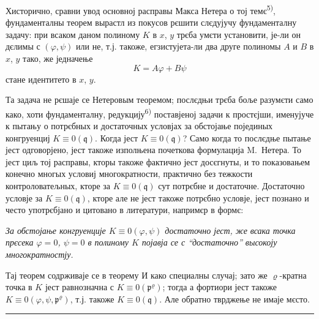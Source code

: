 \documentclass[11pt]{article}
\theoremstyle{plain}
\begin{document}
Хисторично, сравни увод основној расправы Макса Нетера о тој
темє\textsuperscript{5)}, фундаменталны теорем вырастл из покусов
рєшити слєдујучу фундаменталну задачу: при всаком даном полиному
$K$ в $x$, $y$ трєба умєти установити, је-ли он дєлимы с
$(\varphi, \psi)$ или не, т.ј. такоже, егзистујета-ли два друге
полиномы $A$ и $B$ в $x$, $y$ тако, же једначење
\[
K = A\varphi + B\psi
\]
стане идентитето в $x$, $y$.

Та задача не рєшаје се Нетеровым теоремом; послєдњи трєба боље
разумєти само како, хоти фундаменталну, редукцију\textsuperscript{6)}
поставјеној задачи к простєјши, именујуче к пытању о потрєбных и
достаточных условјах за обстојање појединых конгруенциј
$K \equiv 0(\mathfrak{q})$. Когда јест $K \equiv 0(\mathfrak{q})$?
Само когда то послєдње пытање јест одговорјено, јест такоже
изполњена почеткова формулација M.\ Нетера. То јест циљ тој
расправы, кторы такоже фактично јест досєгнуты, и то показовањем
конечно многых условиј многократности, практично без тежкости
контроловатељных, кторе за $K \equiv 0(\mathfrak{q})$ сут
потрєбне и достаточне. Достаточно условје за
$K \equiv 0(\mathfrak{q})$, кторе але не јест такоже потрєбно
условје, јест познано и често употрєбјано и цитовано в литератури,
напримєр в формє:

\smallskip
\textit{За обстојање конгруенције $K \equiv 0(\varphi, \psi)$
достаточно јест, же всака точка прєсека $\varphi = 0$, $\psi = 0$
в полиному $K$ појавја се с ``достаточно'' высокоју многократностју.}

\smallskip
Тај теорем содрживаје се в теорему И како специалны случај; зато же
$\varrho$-кратна точка в $K$ јест равнозначна с
$K \equiv 0(\mathfrak{p}^{\varrho})$; тогда а фортиори јест такоже
$K \equiv 0(\varphi, \psi, \mathfrak{p}^{\varrho})$, т.ј. такоже
$K \equiv 0(\mathfrak{q})$. Але обратно тврджење не имаје мєсто.

\vspace{0.5em}
\noindent\rule{\textwidth}{0.4pt}
\vspace{0.3em}
\end{document}
